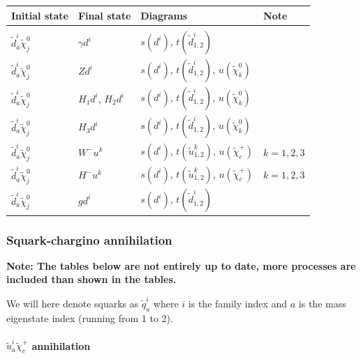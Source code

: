 \documentclass[a4paper,10pt,oneside]{book}
\newcommand{\tabspace}{\\[-2.5ex]}
\begin{document}
\begin{center}
\begin{tabular}{llll} \hline
{\bfseries Initial state} & {\bfseries Final state} &
{\bfseries Diagrams} & {\bfseries Note} \\ \hline \tabspace
$\tilde{d}^i_a \tilde{\chi}_{j}^0$ & $\gamma d^i$ &
$s(d^{i})$, $t(\tilde{d}^i_{1,2})$  \\
$\tilde{d}^i_a \tilde{\chi}_{j}^0$ & $Z d^i$ &
$s(d^{i})$, $t(\tilde{d}^i_{1,2})$, $u(\tilde{\chi}_k^0)$ \\
$\tilde{d}^i_a \tilde{\chi}_{j}^0$ & $H_{1} d^i$, $H_{2} d^i$ &
$s(d^{i})$, $t(\tilde{d}^i_{1,2})$, $u(\tilde{\chi}_k^0)$ \\
$\tilde{d}^i_a \tilde{\chi}_{j}^0$ & $H_{3} d^i$  &
$s(d^{i})$, $t(\tilde{d}^i_{1,2})$, $u(\tilde{\chi}_k^0)$ \\ 
$\tilde{d}^i_a \tilde{\chi}_{j}^0$ & $W^- u^k$  &
$s(d^{i})$, $t(\tilde{u}^k_{1,2})$, $u(\tilde{\chi}_c^+)$ 
& $k=1,2,3$ \\
$\tilde{d}^i_a \tilde{\chi}_{j}^0$ & $H^- u^k$  &
$s(d^{i})$, $t(\tilde{u}^k_{1,2})$, $u(\tilde{\chi}_c^+)$ 
& $k=1,2,3$  \\
$\tilde{d}^i_a \tilde{\chi}_{j}^0$ & $g d^i$  &
$s(d^i)$, $t(\tilde{d}^i_{1,2})$ \\ \hline
\end{tabular}
\end{center}

\subsubsection{Squark-chargino annihilation}

{\bfseries Note: The tables below are not entirely up to date, more processes are included
than shown in the tables.}

\smallskip


We will here denote squarks as $\tilde{q}^i_a$ where $i$ is the family
index and $a$ is the mass eigenstate index (running from 1 to 2).

\paragraph{$\tilde{u}^i_{a} \tilde{\chi}_{c}^{+}$ annihilation}
\end{document}
